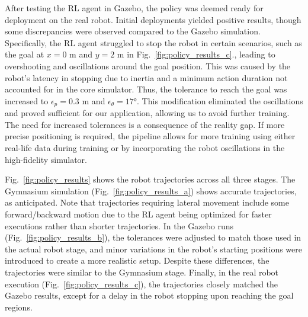 After testing the RL agent in Gazebo, the policy was deemed ready for deployment on the real robot. Initial deployments yielded positive results, though some discrepancies were observed compared to the Gazebo simulation. Specifically, the RL agent struggled to stop the robot in certain scenarios, such as the goal at $x = 0$ m and $y = 2$ m in Fig.~\ref{fig:policy_results_c}., leading to overshooting and oscillations around the goal position. This was caused by the robot's latency in stopping due to inertia and a minimum action duration not accounted for in the core simulator. Thus, the tolerance to reach the goal was increased to $\epsilon_p = 0.3$ m and $\epsilon_\theta = \ang{17}$. This modification eliminated the oscillations and proved sufficient for our application, allowing us to avoid further training. The need for increased tolerances is a consequence of the reality gap. If more precise positioning is required, the pipeline allows for more training using either real-life data during training or by incorporating the robot oscillations in the high-fidelity simulator.

Fig.~\ref{fig:policy_results} shows the robot trajectories across all three stages. The  Gymnasium simulation (Fig.\ \ref{fig:policy_results_a}) shows accurate trajectories, as anticipated. Note that trajectories requiring lateral movement include some  forward/backward motion due to the RL agent being optimized for faster executions rather than shorter trajectories. In the Gazebo runs (Fig.\ \ref{fig:policy_results_b}), the tolerances were adjusted to match those used in the actual robot stage, and minor variations in the robot's starting positions were introduced to create a more realistic setup. Despite these differences, the trajectories were similar to the Gymnasium stage. Finally, in the real robot execution (Fig.\ \ref{fig:policy_results_c}), the trajectories closely matched the Gazebo results, except for a delay in the robot stopping upon reaching the goal regions.

